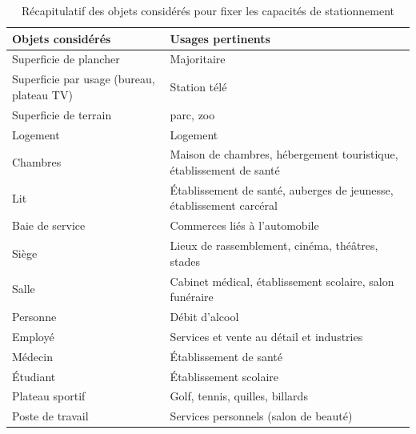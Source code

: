\begin{table}[h]
    
    \caption{Récapitulatif des objets considérés pour fixer les capacités de stationnement}\label{tab:objet_pour_inference_capacite}
    \centering
    \begin{tabular}{p{4cm} p{10cm}}
      \hline
      Objets considérés & Usages pertinents \\
      \hline
      Superficie de plancher & Majoritaire\\
      Superficie par usage (bureau, plateau TV) & Station télé \\
      Superficie de terrain & parc, zoo \\
      Logement & Logement \\
      Chambres & Maison de chambres, hébergement touristique, établissement de santé\\
      Lit & Établissement de santé, auberges de jeunesse, établissement carcéral \\
      Baie de service & Commerces liés à l'automobile\\
      Siège & Lieux de rassemblement, cinéma, théâtres, stades \\
      Salle & Cabinet médical, établissement scolaire, salon funéraire\\
      Personne & Débit d'alcool\\
      Employé & Services et vente au détail et industries\\
      Médecin & Établissement de santé\\
      Étudiant & Établissement scolaire\\
      Plateau sportif & Golf, tennis, quilles, billards\\
      Poste de travail & Services personnels (salon de beauté)\\
      \hline
    \end{tabular}
  \end{table}

  \FloatBarrier